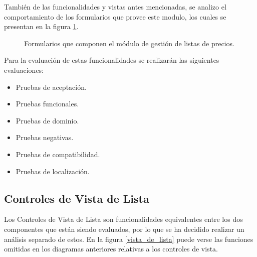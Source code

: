 También de las funcionalidades y vistas antes mencionadas, se analizo el
comportamiento de los formularios que provee este modulo, los cuales se
presentan en la figura \ref{listas_de_precios_formularios}.

\begin{figure}
\centering
{}
\caption{Formularios que componen el módulo de gestión de listas de precios.}
\label{listas_de_precios_formularios}
\end{figure}

Para la evaluación de estas funcionalidades se realizarán las siguientes
evaluaciones:

\begin{itemize}
\item Pruebas de aceptación.
\item Pruebas funcionales.
\item Pruebas de dominio.
\item Pruebas negativas.
\item Pruebas de compatibilidad.
\item Pruebas de localización.
\end{itemize}

\subsection{Controles de Vista de Lista}
Los Controles de Vista de Lista son funcionalidades equivalentes entre los 
dos componentes que están siendo evaluados, por lo que se ha decidido realizar
un análisis separado de estos. En la figura \ref{vista_de_lista} puede verse
las funciones omitidas en los diagramas anteriores relativas a los controles de
vista.

